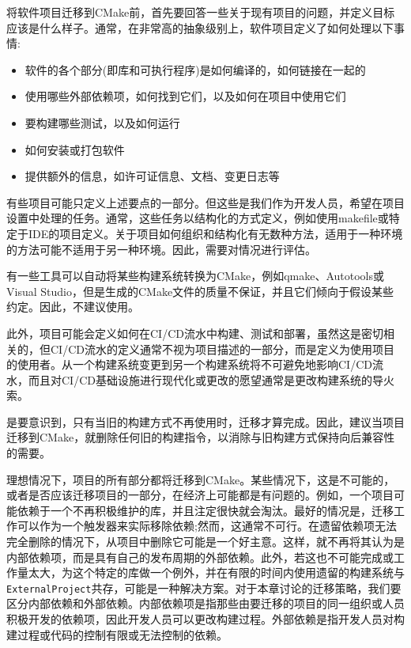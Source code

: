 将软件项目迁移到CMake前，首先要回答一些关于现有项目的问题，并定义目标应该是什么样子。通常，在非常高的抽象级别上，软件项目定义了如何处理以下事情:

\begin{itemize}
\item 
软件的各个部分(即库和可执行程序)是如何编译的，如何链接在一起的

\item 
使用哪些外部依赖项，如何找到它们，以及如何在项目中使用它们

\item 
要构建哪些测试，以及如何运行

\item 
如何安装或打包软件

\item 
提供额外的信息，如许可证信息、文档、变更日志等
\end{itemize}

有些项目可能只定义上述要点的一部分。但这些是我们作为开发人员，希望在项目设置中处理的任务。通常，这些任务以结构化的方式定义，例如使用makefile或特定于IDE的项目定义。关于项目如何组织和结构化有无数种方法，适用于一种环境的方法可能不适用于另一种环境。因此，需要对情况进行评估。

有一些工具可以自动将某些构建系统转换为CMake，例如qmake、Autotools或Visual Studio，但是生成的CMake文件的质量不保证，并且它们倾向于假设某些约定。因此，不建议使用。

此外，项目可能会定义如何在CI/CD流水中构建、测试和部署，虽然这是密切相关的，但CI/CD流水的定义通常不视为项目描述的一部分，而是定义为使用项目的使用者。从一个构建系统变更到另一个构建系统将不可避免地影响CI/CD流水，而且对CI/CD基础设施进行现代化或更改的愿望通常是更改构建系统的导火索。

是要意识到，只有当旧的构建方式不再使用时，迁移才算完成。因此，建议当项目迁移到CMake，就删除任何旧的构建指令，以消除与旧构建方式保持向后兼容性的需要。

理想情况下，项目的所有部分都将迁移到CMake。某些情况下，这是不可能的，或者是否应该迁移项目的一部分，在经济上可能都是有问题的。例如，一个项目可能依赖于一个不再积极维护的库，并且注定很快就会淘汰。最好的情况是，迁移工作可以作为一个触发器来实际移除依赖;然而，这通常不可行。在遗留依赖项无法完全删除的情况下，从项目中删除它可能是一个好主意。这样，就不再将其认为是内部依赖项，而是具有自己的发布周期的外部依赖。此外，若这也不可能完成或工作量太大，为这个特定的库做一个例外，并在有限的时间内使用遗留的构建系统与\texttt{ExternalProject}共存，可能是一种解决方案。对于本章讨论的迁移策略，我们要区分内部依赖和外部依赖。内部依赖项是指那些由要迁移的项目的同一组织或人员积极开发的依赖项，因此开发人员可以更改构建过程。外部依赖是指开发人员对构建过程或代码的控制有限或无法控制的依赖。

